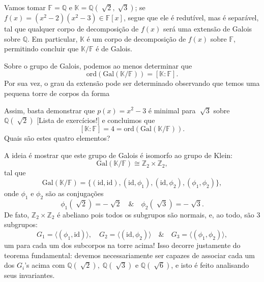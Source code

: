 \documentclass[../algebraIII_notes.tex]{subfiles}
\begin{document}
\begin{example}[Complicado]
	Vamos tomar \(\mathbb{F} = \mathbb{Q}\) e \(\mathbb{K} = \mathbb{Q}(\sqrt[]{2}, \sqrt[]{3})\); se \(f(x)=(x^{2}-2)(x^{2}-3)\in \mathbb{F}[x]\), segue que ele é redutível, mas é separável, tal que qualquer corpo de decomposição de \(f(x)\) será uma extensão de Galois sobre \(\mathbb{Q}\). Em particular, \(\mathbb{K}\) é um corpo de decomposição de \(f(x)\) sobre \(\mathbb{F}\), permitindo concluir que \(\mathbb{K}/\mathbb{F}\) é de Galois.

	Sobre o grupo de Galois, podemos ao menos determinar que
	\[
		\mathrm{ord}(\mathrm{Gal}(\mathbb{K}/\mathbb{F}))=[\mathbb{K}:\mathbb{F}].
	\]
	Por sua vez, o grau da extensão pode ser determinado observando que temos uma pequena torre de corpos da forma
	\begin{center}
	\end{center}
	Assim, basta demonstrar que \(p(x)=x^{2}-3\) é minimal para \(\sqrt[]{3}\) sobre \(\mathbb{Q}(\sqrt[]{2})\) [Lista de exercícios!] e concluimos que
	\[
		[\mathbb{K}:\mathbb{F}] = 4 = \mathrm{ord}(\mathrm{Gal}(\mathbb{K}/\mathbb{F})).
	\]
	Quais são estes quatro elementos?

	A ideia é mostrar que este grupo de Galois é isomorfo ao grupo de Klein:
	\[
		\mathrm{Gal}(\mathbb{K}/\mathbb{F})\cong \mathbb{Z}_2 \times \mathbb{Z}_2,
	\]
	tal que
	\[
		\mathrm{Gal}(\mathbb{K}/\mathbb{F}) = \{(\mathrm{id}, \mathrm{id}), (\mathrm{id}, \phi_1), (\mathrm{id}, \phi_2), (\phi_1, \phi_2)\},
	\]
	onde \(\phi_1\) e \(\phi_2\) são as conjugações
	\[
		\phi_1(\sqrt[]{2}) = -\sqrt[]{2} \quad\&\quad \phi_2(\sqrt[]{3})=-\sqrt[]{3}.
	\]
	De fato, \(\mathbb{Z}_2 \times \mathbb{Z}_2\) é abeliano pois todos os subgrupos são normais, e, ao todo, são 3 subgrupos:
	\[
		G_1 = \langle (\phi_1, \mathrm{id}) \rangle, \quad G_2 = \langle (\mathrm{id}, \phi_2) \rangle \quad\&\quad G_3= \langle (\phi_1, \phi_2) \rangle,
	\]
	um para cada um dos subcorpos na torre acima! Isso decorre justamente do teorema fundamental: devemos necessariamente ser capazes de associar cada um dos \(G_{i}\)'s acima com \(\mathbb{Q}(\sqrt[]{2}),\; \mathbb{Q}(\sqrt[]{3})\) e \(\mathbb{Q}(\sqrt[]{6})\), e isto é feito analisando seus invariantes.


\end{example}
\end{document}
